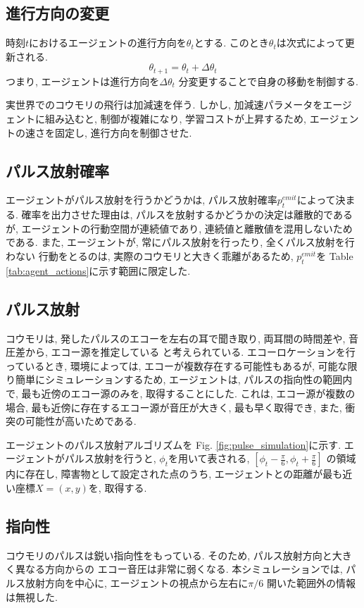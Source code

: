 \documentclass[../main]{subfiles}
\begin{document}
\subsection{進行方向の変更}
時刻$t$におけるエージェントの進行方向を$\theta_t$とする.
このとき$\theta_t$は次式によって更新される.
$$\theta_{t+1}=\theta_t+\Delta\theta_t$$
つまり, エージェントは進行方向を$\Delta\theta_t$
分変更することで自身の移動を制御する.

実世界でのコウモリの飛行は加減速を伴う.
しかし, 加減速パラメータをエージェントに組み込むと, 
制御が複雑になり, 学習コストが上昇するため, 
エージェントの速さを固定し, 進行方向を制御させた.

\subsection{パルス放射確率}
エージェントがパルス放射を行うかどうかは, 
パルス放射確率$p^{emit}_t$によって決まる.
確率を出力させた理由は, 
パルスを放射するかどうかの決定は離散的であるが, 
エージェントの行動空間が連続値であり, 
連続値と離散値を混用しないためである.
また, エージェントが, 
常にパルス放射を行ったり, 全くパルス放射を行わない
行動をとるのは, 実際のコウモリと大きく乖離があるため, 
$p^{emit}_t$を
Table \ref{tab:agent_actions}に示す範囲に限定した.

\subsection{パルス放射}
コウモリは, 発したパルスのエコーを左右の耳で聞き取り, 
両耳間の時間差や, 音圧差から, エコー源を推定している
と考えられている.
エコーロケーションを行っているとき, 
環境によっては, エコーが複数存在する可能性もあるが, 
可能な限り簡単にシミュレーションするため, 
エージェントは, パルスの指向性の範囲内で, 
最も近傍のエコー源のみを, 取得することにした.
これは, エコー源が複数の場合, 
最も近傍に存在するエコー源が音圧が大きく, 
最も早く取得でき, また, 衝突の可能性が高いためである.

エージェントのパルス放射アルゴリズムを
Fig. \ref{fig:pulse_simulation}に示す.
エージェントがパルス放射を行うと, 
$\phi_t$を用いて表される, 
$[\phi_t-\frac{\pi}{6}, \phi_t+\frac{\pi}{6}]$
の領域内に存在し, 障害物として設定された点のうち, 
エージェントとの距離が最も近い座標$X=(x, y)$を, 
取得する.

\subsection{指向性}
コウモリのパルスは鋭い指向性をもっている.
そのため, パルス放射方向と大きく異なる方向からの
エコー音圧は非常に弱くなる.
本シミュレーションでは, パルス放射方向を中心に, 
エージェントの視点から左右に$\pi/6$
開いた範囲外の情報は無視した.
\end{document}
